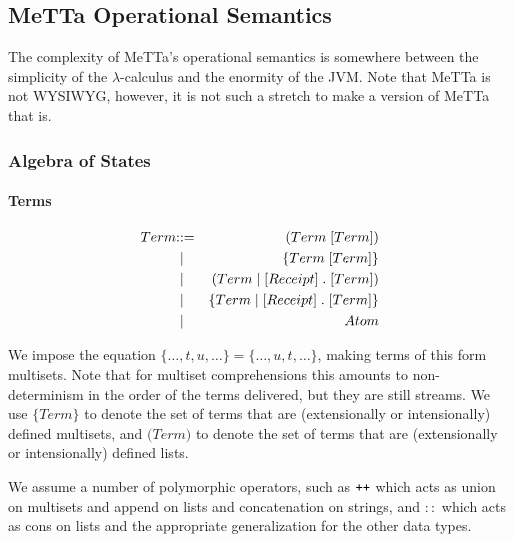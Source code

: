 \subsection{MeTTa Operational Semantics}
The complexity of MeTTa's operational semantics is somewhere between the simplicity of the $\lambda$-calculus and the enormity of the JVM. Note that MeTTa is not WYSIWYG, however, it is not such a stretch to make a version of MeTTa that is.

\subsubsection{Algebra of States}


\paragraph{Terms}
\begin{eqnarray*}
  Term & \mathbin{\mathbf{::=}} & \mathsf{(} Term \; [Term] \mathsf{)} \\
  & \;\mathbin{\mathbf\mid}\; & \mathsf{\{} Term \; [Term] \mathsf{\}} \\
  & \;\mathbin{\mathbf\mid}\; & \mathsf{(} Term{} \;\mathsf{|}\; [Receipt] \; \mathsf{.} \; [Term] \mathsf{)} \\
  & \;\mathbin{\mathbf\mid}\; & \mathsf{\{} Term \;\mathsf{|}\; [Receipt] \; \mathsf{.} \; [Term] \mathsf{\}} \\
& \;\mathbin{\mathbf\mid}\; & Atom
\end{eqnarray*}

We impose the equation $\mathsf{\{} \ldots, t, u, \ldots \mathsf{\}} = \mathsf{\{} \ldots, u, t, \ldots \mathsf{\}}$, making terms of this form multisets. Note that for multiset comprehensions this amounts to non-determinism in the order of the terms delivered, but they are still streams. We use $\mathsf{\{}Term\mathsf{\}}$ to denote the set of terms that are (extensionally or intensionally) defined multisets, and $\mathsf{(}Term\mathsf{)}$ to denote the set of terms that are (extensionally or intensionally) defined lists.

We assume a number of polymorphic operators, such as $\mathbin{\text{\ttfamily\upshape ++}}$ which acts as union on multisets and append on lists and concatenation on strings, and $::$ which acts as cons on lists and the appropriate generalization for the other data types.

